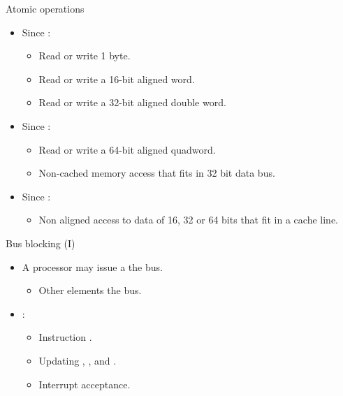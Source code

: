 \begin{frame}[t]{Atomic operations}
\begin{itemize}
  \item Since :
    \begin{itemize}
      \item Read or write 1 byte.
      \item Read or write a 16-bit aligned word.
      \item Read or write a 32-bit aligned double word.
    \end{itemize}

  \item Since :
    \begin{itemize}
      \item Read or write a 64-bit aligned quadword.
      \item Non-cached memory access that fits in 32 bit data bus.
    \end{itemize}

  \item Since :
    \begin{itemize}
      \item Non aligned access to data of 16, 32 or 64 bits that fit in a cache line.
    \end{itemize}
\end{itemize}
\end{frame}

\begin{frame}[t]{Bus blocking (I)}
\begin{itemize}
  \item A processor may issue a  the bus.
    \begin{itemize}
      \item Other elements  the bus.
    \end{itemize}

  \item {}:
    \begin{itemize}
      \item Instruction .
      \item Updating , 
            , and
            .
      \item Interrupt acceptance.
    \end{itemize}
\end{itemize}
\end{frame}

